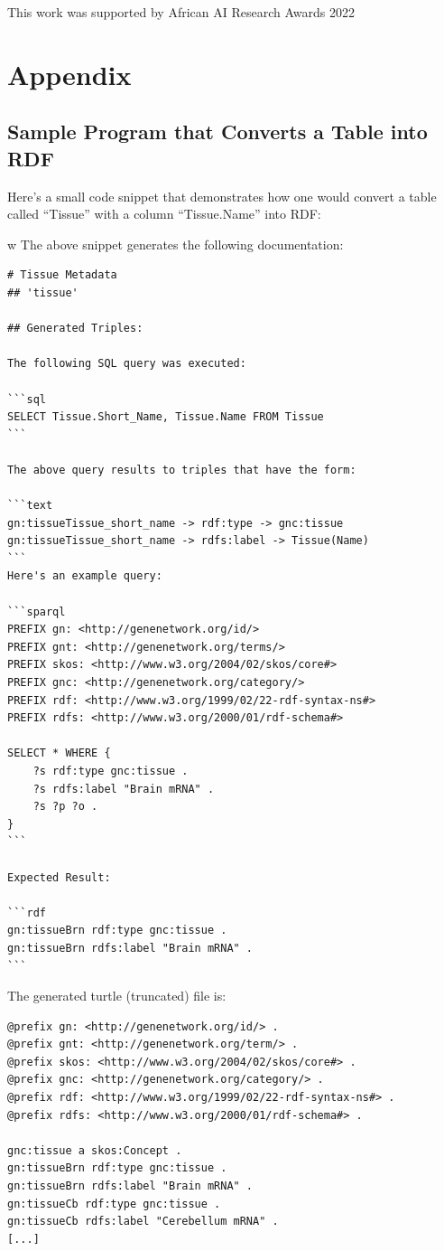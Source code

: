 \documentclass{article}
\begin{document}
\begin{ack}
This work was supported by African AI Research Awards 2022 
\end{ack}




\appendix

\section{Appendix}

\subsection{Sample Program that Converts a Table into RDF}
\label{appendix:sample-program}
Here's a small code snippet that demonstrates how one would convert a table called ``Tissue'' with a column ``Tissue.Name'' into RDF:


w
The above snippet generates the following documentation:

\begin{Verbatim}[frame=single]
# Tissue Metadata
## 'tissue'

## Generated Triples:

The following SQL query was executed:

```sql
SELECT Tissue.Short_Name, Tissue.Name FROM Tissue
```

The above query results to triples that have the form:

```text
gn:tissueTissue_short_name -> rdf:type -> gnc:tissue 
gn:tissueTissue_short_name -> rdfs:label -> Tissue(Name) 
```
Here's an example query:

```sparql
PREFIX gn: <http://genenetwork.org/id/> 
PREFIX gnt: <http://genenetwork.org/terms/> 
PREFIX skos: <http://www.w3.org/2004/02/skos/core#> 
PREFIX gnc: <http://genenetwork.org/category/> 
PREFIX rdf: <http://www.w3.org/1999/02/22-rdf-syntax-ns#> 
PREFIX rdfs: <http://www.w3.org/2000/01/rdf-schema#> 

SELECT * WHERE { 
    ?s rdf:type gnc:tissue .
    ?s rdfs:label "Brain mRNA" .
    ?s ?p ?o .
}
```

Expected Result:

```rdf
gn:tissueBrn rdf:type gnc:tissue .
gn:tissueBrn rdfs:label "Brain mRNA" .
```
\end{Verbatim}


The generated turtle (truncated) file is:

\begin{Verbatim}[frame=single]
@prefix gn: <http://genenetwork.org/id/> .
@prefix gnt: <http://genenetwork.org/term/> .
@prefix skos: <http://www.w3.org/2004/02/skos/core#> .
@prefix gnc: <http://genenetwork.org/category/> .
@prefix rdf: <http://www.w3.org/1999/02/22-rdf-syntax-ns#> .
@prefix rdfs: <http://www.w3.org/2000/01/rdf-schema#> .

gnc:tissue a skos:Concept .
gn:tissueBrn rdf:type gnc:tissue .
gn:tissueBrn rdfs:label "Brain mRNA" .
gn:tissueCb rdf:type gnc:tissue .
gn:tissueCb rdfs:label "Cerebellum mRNA" .
[...]
\end{Verbatim}
\end{document}
